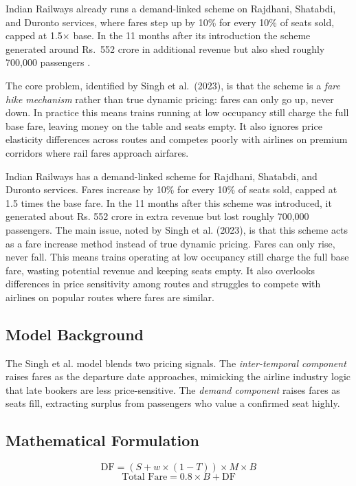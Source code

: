 \documentclass[10pt,a4paper]{article}
\begin{document}
Indian Railways already runs a demand-linked scheme on Rajdhani, Shatabdi, 
and Duronto services, where fares step up by 10\% for every 10\% of seats sold, 
capped at 1.5$\times$ base. In the 11 months after its introduction the scheme 
generated around Rs.\ 552 crore in additional revenue but also shed roughly 
700,000 passengers \cite{mint2017}.
 
The core problem, identified by Singh et al.\ (2023), is that the scheme is 
a \textit{fare hike mechanism} rather than true dynamic pricing: fares can 
only go up, never down. In practice this means trains running at low occupancy 
still charge the full base fare, leaving money on the table and seats empty. 
It also ignores price elasticity differences across routes and competes poorly 
with airlines on premium corridors where rail fares approach airfares.

Indian Railways has a demand-linked scheme for Rajdhani, Shatabdi, and 
Duronto services. Fares increase by 10\% for every 10\% of seats sold, 
capped at 1.5 times the base fare. In the 11 months after this scheme was 
introduced, it generated about Rs. 552 crore in extra revenue but lost 
roughly 700,000 passengers. The main issue, noted by Singh et al. (2023), 
is that this scheme acts as a fare increase method instead of true dynamic 
pricing. Fares can only rise, never fall. This means trains operating at 
low occupancy still charge the full base fare, wasting potential revenue 
and keeping seats empty. It also overlooks differences in price sensitivity 
among routes and struggles to compete with airlines on popular routes where fares are similar. 

\subsection{Model Background}

The Singh et al.\cite{singh2023} model blends two pricing signals. 
The \textit{inter-temporal component} raises fares as the departure date 
approaches, mimicking the airline industry logic that late bookers are 
less price-sensitive. The \textit{demand component} raises fares as seats 
fill, extracting surplus from passengers who value a confirmed seat highly.

\subsection{Mathematical Formulation}
\begin{equation}
\text{DF} = (S + w \times (1 - T)) \times M \times B
\end{equation}
\begin{equation}
\text{Total Fare} = 0.8 \times B + \text{DF}
\end{equation}
\end{document}
